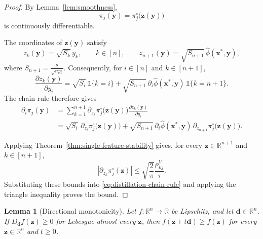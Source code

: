 \documentclass[12pt]{article}
\newtheorem{lemma}{Lemma}
\theoremstyle{definition}
\begin{document}
\begin{proof}
By Lemma~\ref{lem:smoothness},
\[
    \pi_j(\boldsymbol y)
    =
    \pi_j^\circ\bigl(\boldsymbol z(\boldsymbol y)\bigr)
\]
is continuously differentiable. 

The coordinates of $\boldsymbol z(\boldsymbol y)$ satisfy
\[
    z_k(\boldsymbol y)
    =
    \sqrt{S_k}\,y_k,
    \qquad k\in[n], \qquad
    z_{n+1}(\boldsymbol y)
    =
    \sqrt{S_{n+1}}\,\hat\phi(\bm{x}^*, \bm{y}),
\]
where $S_{n+1}=\frac{\mu}{\sqrt{n_{\mathrm{eff}}}}$.
Consequently, for $i\in[n]$ and $k\in[n+1]$,
\[
    \frac{\partial z_k(\boldsymbol y)}{\partial y_i}
    =
    \sqrt{S_i}\,\mathds{1}\{k=i\}
    +
    \sqrt{S_{n+1}}\,
    \partial_i\hat\phi(\bm{x}^*, \bm{y})\,
    \mathds{1}\{k=n+1\}.
\]
The chain rule therefore gives
\begin{align}
    \partial_i\pi_j(\boldsymbol y)
    &=
    \sum_{k=1}^{n+1}
    \partial_{z_k}\pi_j^\circ\bigl(\boldsymbol z(\boldsymbol y)\bigr)
    \frac{\partial z_k(\boldsymbol y)}{\partial y_i}
    \nonumber\\
    &=
    \sqrt{S_i}\,
    \partial_{z_i}\pi_j^\circ\bigl(\boldsymbol z(\boldsymbol y)\bigr)
    +
    \sqrt{S_{n+1}}\,
    \partial_i\hat\phi(\bm{x}^*, \bm{y})\,
    \partial_{z_{n+1}}\pi_j^\circ\bigl(\boldsymbol z(\boldsymbol y)\bigr).
    \label{eq:distillation-chain-rule}
\end{align}

Applying Theorem~\ref{thm:single-feature-stability} gives, for every $\boldsymbol z\in\mathbb R^{n+1}$ and $k\in[n+1]$,
\[
    \left|
        \partial_{z_k}\pi_j^\circ(\boldsymbol z)
    \right|
    \le
    \sqrt{\frac{2}{\pi}}\frac{\rho_{kj}^V}{\tau}.
\]
Substituting these bounds into
\eqref{eq:distillation-chain-rule} and applying the triangle
inequality proves the bound.
\end{proof}

\begin{lemma}[Directional monotonicity]
\label{lem:ae-directional-monotonicity}
Let $f:\mathbb R^n\to\mathbb R$ be Lipschitz, and let
$\boldsymbol d\in\mathbb R^n$. 
If $D_{\boldsymbol d}f(\boldsymbol z)\ge0$ for Lebesgue-almost every $\boldsymbol z$, then $f(\boldsymbol z+t\boldsymbol d)\ge f(\boldsymbol z)$ for every $\boldsymbol z\in\mathbb R^n$ and $t\ge0$.
\end{lemma}
\end{document}
